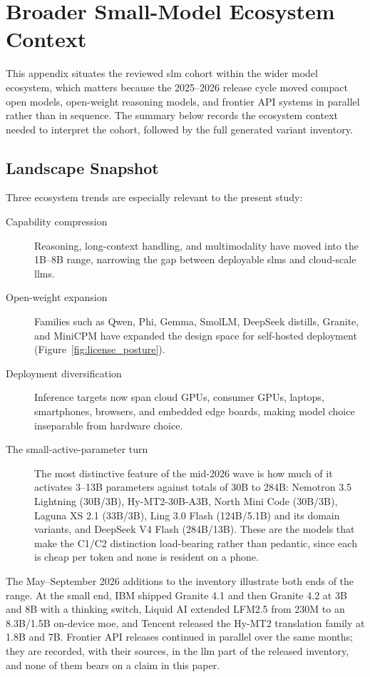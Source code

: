 \section{Broader Small-Model Ecosystem Context}
\label{appendix:ecosystem}
\label{supp:last}

This appendix situates the reviewed \gls{slm} cohort within the wider model ecosystem, which matters because the 2025--2026 release cycle moved compact open models, open-weight reasoning models, and frontier API systems in parallel rather than in sequence. The summary below records the ecosystem context needed to interpret the cohort, followed by the full generated variant inventory.

\subsection{Landscape Snapshot}
\label{subsec:ecosystem_snapshot}
Three ecosystem trends are especially relevant to the present study:
\begin{description}
    \item[Capability compression] Reasoning, long-context handling, and multimodality have moved into the 1B--8B range, narrowing the gap between deployable \glspl{slm} and cloud-scale \glspl{llm}.
    \item[Open-weight expansion] Families such as Qwen, Phi, Gemma, SmolLM, DeepSeek distills, Granite, and MiniCPM have expanded the design space for self-hosted deployment (Figure~\ref{fig:license_posture}).
    \item[Deployment diversification] Inference targets now span cloud GPUs, consumer GPUs, laptops, smartphones, browsers, and embedded edge boards, making model choice inseparable from hardware choice.
    \item[The small-active-parameter turn] The most distinctive feature of the mid-2026 wave is how much of it activates 3--13B parameters against totals of 30B to 284B: Nemotron 3.5 Lightning (30B/3B), Hy-MT2-30B-A3B, North Mini Code (30B/3B), Laguna XS 2.1 (33B/3B), Ling 3.0 Flash (124B/5.1B) and its domain variants, and DeepSeek V4 Flash (284B/13B). These are the models that make the C1/C2 distinction load-bearing rather than pedantic, since each is cheap per token and none is resident on a phone.
\end{description}

The May--September 2026 additions to the inventory illustrate both ends of the range. At the small end, IBM shipped Granite 4.1 and then Granite 4.2 at 3B and 8B with a thinking switch, Liquid AI extended LFM2.5 from 230M to an 8.3B/1.5B on-device \gls{moe}, and Tencent released the Hy-MT2 translation family at 1.8B and 7B. Frontier API releases continued in parallel over the same months; they are recorded, with their sources, in the \gls{llm} part of the released inventory, and none of them bears on a claim in this paper.

